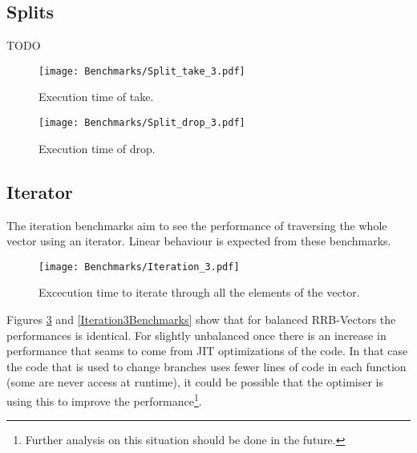 \FloatBarrier

\subsection{Splits}
\color{red} TODO \color{black}

\begin{figure}[h!]
  \centering
  \texttt{[image: Benchmarks/Split\_take\_3.pdf]}
  \label{TakeBenchmarks}
  \caption{Execution time of take.}
\end{figure}


\begin{figure}[h!]
  \centering
  \texttt{[image: Benchmarks/Split\_drop\_3.pdf]}
  \label{DropBenchmarks}
  \caption{Execution time of drop.}
\end{figure}


\FloatBarrier

\subsection{Iterator}
The iteration benchmarks aim to see the performance of traversing the whole vector using an iterator. Linear behaviour is expected from these benchmarks.

\begin{figure}[h!]
  \centering
  \texttt{[image: Benchmarks/Iteration\_3.pdf]}
  \caption{Excecution time to iterate through all the elements of the vector.}
  \label{Iteration2Benchmarks}
\end{figure}

Figures \ref{Iteration2Benchmarks} and \ref{Iteration3Benchmarks} show that for balanced RRB-Vectors the performances is identical. For slightly unbalanced once there is an increase in performance that seams to come from JIT optimizations of the code. In that case the code that is used to change branches uses fewer lines of code in each function (some are never access at runtime), it could be possible that the optimiser is using this to improve the performance\footnote{Further analysis on this situation should be done in the future.}. 

